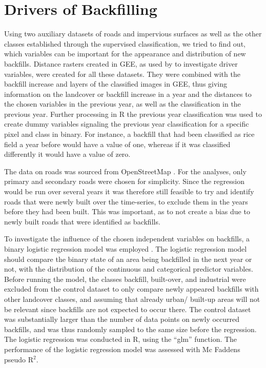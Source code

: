 \documentclass[11pt, A4, oneside]{report}
\begin{document}
\section{Drivers of Backfilling} 
Using two auxiliary datasets of roads and impervious surfaces as well as the other classes established through the supervised classification, we tried to find out, which variables can be important for the appearance and distribution of new backfills. Distance rasters created in GEE, as used by \citet{Floreano.2021} to investigate driver variables, were created for all these datasets. They were combined with the backfill increase and layers of the classified images in GEE, thus giving information on the landcover or backfill increase in a year and the distances to the chosen variables in the previous year, as well as the classification in the previous year. Further processing in R the previous year classification was used to create dummy variables signaling the previous year classification for a specific pixel and class in binary. For instance, a backfill that had been classified as rice field a year before would have a value of one, whereas if it was classified differently it would have a value of zero.  

The data on roads was sourced from OpenStreetMap \parencite{Geofabrik}. For the analyses, only primary and secondary roads were chosen for simplicity. Since the regression would be run over several years it was therefore still feasible to try and identify roads that were newly built over the time-series, to exclude them in the years before they had been built. This was important, as to not create a bias due to newly built roads that were identified as backfills.

To investigate the influence of the chosen independent variables on backfills, a binary logistic regression model was employed \parencite{Peng.2002, Manning.2007}. The logistic regression model should compare the binary state of an area being backfilled in the next year or not, with the distribution of the continuous and categorical predictor variables. Before running the model, the classes backfill, built-over, and industrial were excluded from the control dataset to only compare newly appeared backfills with other landcover classes, and assuming that already urban/ built-up areas will not be relevant since backfills are not expected to occur there. The control dataset was substantially larger than the number of data points on newly occurred backfills, and was thus randomly sampled to the same size before the regression. The logistic regression was conducted in R, using the ``glm'' function. The performance of the logistic regression model was assessed with Mc Faddens pseudo R$^2$.
\end{document}
